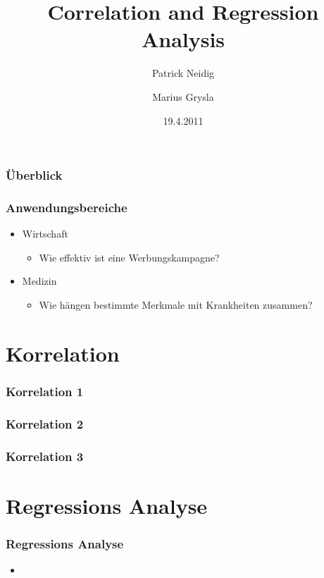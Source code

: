 \documentclass{beamer}
\begin{document}
\title{Correlation and Regression Analysis}
\author{Patrick Neidig \and Marius Grysla}
\date{19.4.2011}
\frame{\titlepage}

\begin{frame}
 \frametitle{Überblick}
 \tableofcontents
\end{frame}

\begin{frame}
 \frametitle{Anwendungsbereiche}

 \begin{itemize}
  \item Wirtschaft
  \begin{itemize}
   \item Wie effektiv ist eine Werbungskampagne?
  \end{itemize}

  \item Medizin
  \begin{itemize}
   \item Wie h\"angen bestimmte Merkmale mit Krankheiten zusammen?
  \end{itemize}

 \end{itemize}

\end{frame}


\section{Korrelation}

\begin{frame}
 \frametitle{Korrelation 1}
\end{frame}

\begin{frame}
 \frametitle{Korrelation 2}
\end{frame}

\begin{frame}
 \frametitle{Korrelation 3}
\end{frame}

\section{Regressions Analyse}

\begin{frame}
 \frametitle{Regressions Analyse}
 

 \begin{itemize}
  \item 
 \end{itemize}

\end{frame}
\end{document}
